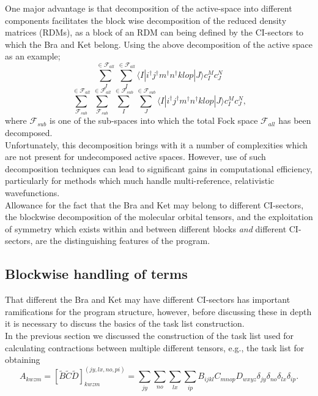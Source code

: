 \documentclass[12pt]{article}
\begin{document}
\noindent One major advantage is that decomposition of the active-space
into different components facilitates the block wise decomposition of the reduced density matrices (RDMs),
as a block of an RDM can being defined by the CI-sectors to 
which the Bra and Ket belong. Using the above decomposition of the 
active space as an example;
\begin{equation*}
\sum_{J}^{ \in \mathcal{F}_{all} }
\sum_{I}^{ \in \mathcal{F}_{all} } \langle I | i^{\dagger}j^{\dagger}m^{\dagger}n^{\dagger}klop | J \rangle c^{M}_{I} c_{J}^{N}
\end{equation*}
\begin{equation*}
\sum^{ \in \mathcal{F}_{all} }_{ \mathcal{F}_{sub} }
\sum^{ \in \mathcal{F}_{all} }_{ \mathcal{F}_{sub} }
\sum^{ \in \mathcal{F}_{sub}}_{I}
\sum^{ \in \mathcal{F}_{sub}}_{J} \langle I | i^{\dagger}j^{\dagger}m^{\dagger}n^{\dagger}klop | J \rangle c^{M}_{I} c_{J}^{N},
\end{equation*}
\noindent where $\mathcal{F}_{sub}$ is one of the sub-spaces
into which the total Fock space $\mathcal{F}_{all}$ has been decomposed.\\

\noindent Unfortunately, this decomposition brings with it a number of
complexities which are not present for undecomposed active spaces. However, 
use of such decomposition techniques can lead to significant gains 
in computational efficiency, particularly for methods which much handle
multi-reference, relativistic wavefunctions.\\ 

\noindent Allowance for the fact that the Bra and Ket may belong to different CI-sectors,
the blockwise decomposition of the molecular orbital tensors, and the exploitation 
of symmetry which exists within and between different blocks \emph{and}  different CI-sectors,
are the distinguishing features of the program.

\subsection{ Blockwise handling of terms } 
\noindent That different the Bra and Ket may have different CI-sectors has
important ramifications for the program structure, however, before discussing
these in depth it is necessary to discuss the basics of the task list
construction.\\

\noindent In the previous section we discussed the construction of the task list 
used for calculating contractions between multiple different tensors, e.g., the 
task list for obtaining
\begin{equation}
A_{kwzm} = 
[\tilde{B}\tilde{C}\tilde{D}]^{(jy,lx,no,pi)}_{kwzm} = \sum_{jy}\sum_{no}\sum_{lx}\sum_{ip} B_{ijkl}C_{mnop}D_{wxyz} \delta_{jy} \delta_{no} \delta_{lx}\delta_{ip}.
\end{equation}
\end{document}
